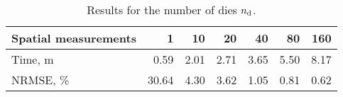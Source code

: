 \begin{table}[h]
  \centering
  \caption{Results for the number of dies ${n_{\text{d}}}$.}
  \begin{tabular*}{1\linewidth}{lrrrrrr}
    \toprule
    Spatial measurements & 1 & 10 & 20 & 40 & 80 & 160 \\
    \midrule
    Time, m   &  0.59 & 2.01 & 2.71 & 3.65 & 5.50 & 8.17 \\
    NRMSE, \% & 30.64 & 4.30 & 3.62 & 1.05 & 0.81 & 0.62 \\
    \bottomrule
  \end{tabular*}
  \vspace{-1em}
\end{table}
